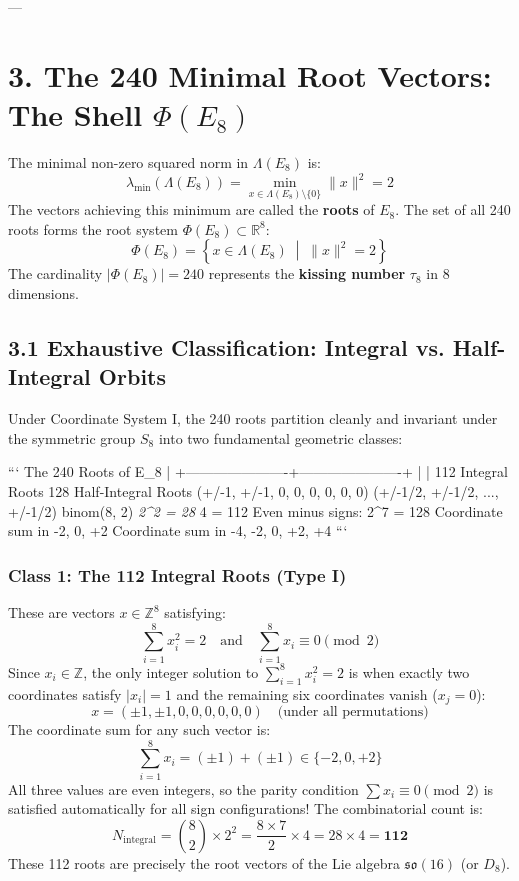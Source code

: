 \documentclass[11pt,twoside,openright]{amsbook}
\begin{document}
---

\section{3. The 240 Minimal Root Vectors: The Shell $\Phi(E_8)$}

The minimal non-zero squared norm in $\Lambda(E_8)$ is:
$$\lambda_{\min}(\Lambda(E_8)) = \min_{x \in \Lambda(E_8) \setminus \{0\}} \|x\|^2 = 2$$
The vectors achieving this minimum are called the \textbf{roots} of $E_8$. The set of all 240 roots forms the root system $\Phi(E_8) \subset \mathbb{R}^8$:
$$\Phi(E_8) = \left\{ x \in \Lambda(E_8) \;\middle|\; \|x\|^2 = 2 \right\}$$
The cardinality $|\Phi(E_8)| = 240$ represents the \textbf{kissing number} $\tau_8$ in 8 dimensions.

\subsection{3.1 Exhaustive Classification: Integral vs. Half-Integral Orbits}

Under Coordinate System I, the 240 roots partition cleanly and invariant under the symmetric group $S_8$ into two fundamental geometric classes:

```
                           The 240 Roots of E_8
                                     |
              +----------------------+----------------------+
              |                                             |
     112 Integral Roots                            128 Half-Integral Roots
  (+/-1, +/-1, 0, 0, 0, 0, 0, 0)                   (+/-1/2, +/-1/2, ..., +/-1/2)
  binom(8, 2) \textit{ 2^2 = 28 } 4 = 112                 Even minus signs: 2^7 = 128
  Coordinate sum in {-2, 0, +2}                     Coordinate sum in {-4, -2, 0, +2, +4}
```

\subsubsection{Class 1: The 112 Integral Roots (Type I)}
These are vectors $x \in \mathbb{Z}^8$ satisfying:
$$\sum_{i=1}^8 x_i^2 = 2 \quad \text{and} \quad \sum_{i=1}^8 x_i \equiv 0 \pmod 2$$
Since $x_i \in \mathbb{Z}$, the only integer solution to $\sum_{i=1}^8 x_i^2 = 2$ is when exactly two coordinates satisfy $|x_i| = 1$ and the remaining six coordinates vanish ($x_j = 0$):
$$x = (\pm 1, \pm 1, 0, 0, 0, 0, 0, 0) \quad \text{(under all permutations)}$$
The coordinate sum for any such vector is:
$$\sum_{i=1}^8 x_i = (\pm 1) + (\pm 1) \in \{-2, 0, +2\}$$
All three values are even integers, so the parity condition $\sum x_i \equiv 0 \pmod 2$ is satisfied automatically for all sign configurations!
The combinatorial count is:
$$N_{\text{integral}} = \binom{8}{2} \times 2^2 = \frac{8 \times 7}{2} \times 4 = 28 \times 4 = \mathbf{112}$$
These 112 roots are precisely the root vectors of the Lie algebra $\mathfrak{so}(16)$ (or $D_8$).
\end{document}
